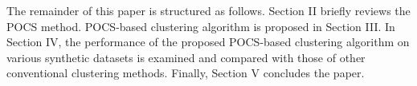 \documentclass[conference]{IEEEtran}
\begin{document}
The remainder of this paper is structured as follows. Section II briefly reviews the POCS method. POCS-based clustering algorithm is proposed in Section III. In Section IV, the performance of the proposed POCS-based clustering algorithm on various synthetic datasets is examined and compared with those of other conventional clustering methods. Finally, Section V concludes the paper.








\end{document}
